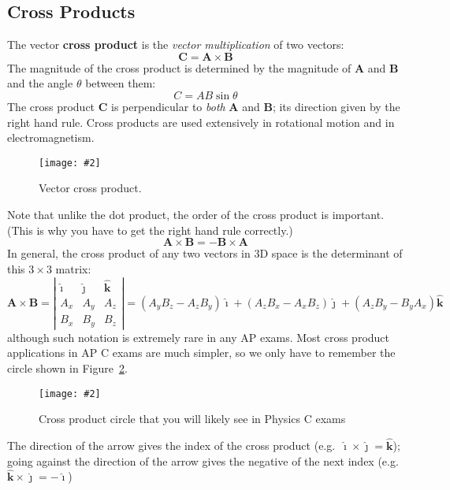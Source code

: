 \documentclass{../../oss-handout}
\newcommand{\pic}[2]{\texttt{[image: \#2]}}
\begin{document}
\subsection{Cross Products}
The vector \textbf{cross product} is the \emph{vector multiplication} of two
vectors:
\begin{equation*}
  \bm{C}=\bm{A}\times\bm{B}
\end{equation*}
The magnitude of the cross product is determined by the magnitude of $\bm{A}$
and $\bm{B}$ and the angle $\theta$ between them:
\begin{equation*}
  C=AB\sin\theta
\end{equation*}
The cross product $\bm{C}$ is perpendicular to \emph{both} $\bm{A}$ and
$\bm{B}$; its direction given by the right hand rule. Cross products are used
extensively in rotational motion and in electromagnetism.
\begin{figure}[ht]
  \centering
  \pic{.3}{cross-product.png}
  \caption{Vector cross product.}
  \label{fig:cross1}
\end{figure}
Note that unlike the dot product, the order of the cross product is important.
(This is why you have to get the right hand rule correctly.)
\begin{equation*}
  \bm{A}\times\bm{B}=-\bm{B}\times\bm{A}
\end{equation*}
In general, the cross product of any two vectors in 3D space is the determinant
of this $3\times 3$ matrix:
\begin{equation*}
  \bm{A}\times\bm{B}=
  \left|
  \begin{matrix}
    \bm{\hat{\imath}} & \bm{\hat{\jmath}} & \bm{\hat{k}}\\
    A_x & A_y & A_z\\
    B_x & B_y & B_z
  \end{matrix}
  \right|
  =(A_yB_z-A_zB_y)\bm{\hat{\imath}} +
  (A_zB_x-A_xB_z)\bm{\hat{\jmath}} +
  (A_zB_y-B_yA_x)\bm{\hat{k}}
\end{equation*}
although such notation is extremely rare in any AP exams. Most cross product
applications in AP C exams are much simpler, so we
only have to remember the circle shown in Figure~\ref{fig:cross2}.
\begin{figure}[ht]
  \centering
  \pic{.12}{cross-product-circle.png}
  \caption{Cross product circle that you will likely see in Physics C exams}
  \label{fig:cross2}
\end{figure}

The direction of the arrow gives the index of the cross product (e.g.\
$\bm{\hat{\imath}}\times\bm{\hat{\jmath}}=\bm{\hat{k}}$); going against the
direction of the arrow gives the negative of the next index (e.g.\
$\bm{\hat{k}}\times\bm{\hat{\jmath}}=-\bm{\hat{\imath}}$)
\end{document}
